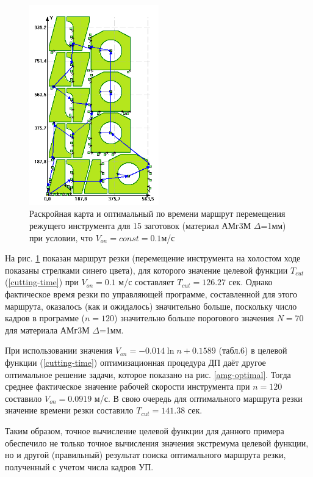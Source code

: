 \documentclass{article}
\begin{document}
\begin{figure}
  \begin{center}
  \includegraphics[width=0.5\textwidth]{amg-cutting.png}
  \caption{Раскройная карта и оптимальный по времени маршрут
  перемещения режущего инструмента для 15 заготовок (материал АМг3М $\Delta$=1мм) при условии, что
  $V_{on}=const=0.1$м/с}
  \label{amg-cutting}
  \end{center}
\end{figure}

На рис. \ref{amg-cutting}
показан маршрут резки
(перемещение инструмента на холостом ходе показаны стрелками синего цвета),
для которого значение целевой функции
$T_{cut}$ (\ref{cutting-time})
при
$V_{on}=0.1$ м/с
составляет
$T_{cut}=126.27$ сек.
Однако фактическое время резки по управляющей программе,
составленной для этого маршрута, оказалось (как и ожидалось)
значительно больше,
поскольку число кадров в программе ($n=120$)
значительно больше порогового значения $N=70$
для материала АМг3М $\Delta$=1мм.

При использовании значения
$V_{on}=-0.014 \ln n + 0.1589$
(табл.6) в целевой функции (\ref{cutting-time})
оптимизационная процедура ДП
даёт другое оптимальное решение задачи,
которое показано на рис. \ref{amg-optimal}.
Тогда среднее фактическое значение рабочей скорости инструмента при $n=120$
составило
$V_{on}=0.0919$ м/с.
В свою очередь для оптимального маршрута резки значение времени резки составило
$T_{cut}=141.38$ сек.

Таким образом,
точное вычисление целевой функции для
данного примера обеспечило не только
точное вычисления значения экстремума
целевой функции, но и другой (правильный)
результат поиска оптимального маршрута резки,
полученный  с учетом числа кадров УП.
\end{document}
